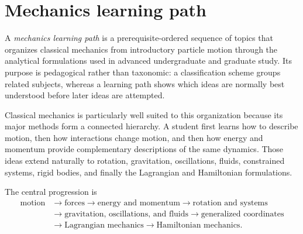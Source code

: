 
\section*{Mechanics learning path}

A \emph{mechanics learning path} is a prerequisite-ordered sequence of topics that organizes
classical mechanics from introductory particle motion through the analytical formulations used
in advanced undergraduate and graduate study.  Its purpose is pedagogical rather than taxonomic:
a classification scheme groups related subjects, whereas a learning path shows which ideas are
normally best understood before later ideas are attempted.

Classical mechanics is particularly well suited to this organization because its major methods
form a connected hierarchy.  A student first learns how to describe motion, then how interactions
change motion, and then how energy and momentum provide complementary descriptions of the same
dynamics.  Those ideas extend naturally to rotation, gravitation, oscillations, fluids, constrained
systems, rigid bodies, and finally the Lagrangian and Hamiltonian formulations.

The central progression is
\[
\begin{aligned}
\text{motion}
&\longrightarrow \text{forces}
\longrightarrow \text{energy and momentum}
\longrightarrow \text{rotation and systems} \\
&\longrightarrow \text{gravitation, oscillations, and fluids}
\longrightarrow \text{generalized coordinates} \\
&\longrightarrow \text{Lagrangian mechanics}
\longrightarrow \text{Hamiltonian mechanics}.
\end{aligned}
\]

